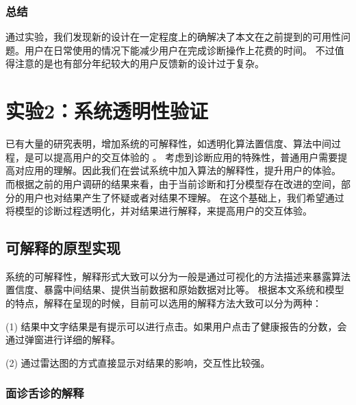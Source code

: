 \subsubsection{总结}
通过实验，我们发现新的设计在一定程度上的确解决了本文在之前提到的可用性问题。用户在日常使用的情况下能减少用户在完成诊断操作上花费的时间。
不过值得注意的是也有部分年纪较大的用户反馈新的设计过于复杂。

\section{实验2：系统透明性验证}

已有大量的研究表明，增加系统的可解释性，如透明化算法置信度、算法中间过程，是可以提高用户的交互体验的 \cite{wang2019designing}\cite{lim2009and}。
考虑到诊断应用的特殊性，普通用户需要提高对应用的理解。因此我们在尝试系统中加入算法的解释性，提升用户的体验。
而根据之前的用户调研的结果来看，由于当前诊断和打分模型存在改进的空间，部分的用户也对结果产生了怀疑或者对结果不理解。
在这个基础上，我们希望通过将模型的诊断过程透明化，并对结果进行解释，来提高用户的交互体验。

\subsection{可解释的原型实现}
系统的可解释性，解释形式大致可以分为一般是通过可视化的方法描述来暴露算法置信度、暴露中间结果、提供当前数据和原始数据对比等\cite{wang2019designing}。
根据本文系统和模型的特点\cite{kocielnik2019will}，解释在呈现的时候，目前可以选用的解释方法大致可以分为两种：

(1) 结果中文字结果是有提示可以进行点击。如果用户点击了健康报告的分数，会通过弹窗进行详细的解释。

(2) 通过雷达图的方式直接显示对结果的影响，交互性比较强。

\subsubsection{面诊舌诊的解释}

